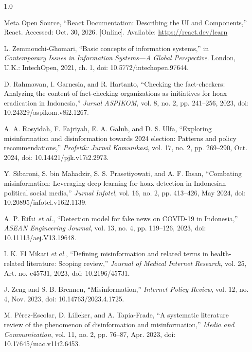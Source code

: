 \documentclass[12pt,a4paper,twoside]{report}
\begin{document}
\begin{spacing}{1.0}
\begin{enumerate}[label={[\arabic*]},leftmargin=0.9cm,itemsep=5pt,topsep=2pt]
  \item Meta Open Source, ``React Documentation: Describing the UI and Components,'' React. Accessed: Oct. 30, 2026. [Online]. Available: \url{https://react.dev/learn}

  \item L. Zemmouchi-Ghomari, ``Basic concepts of information systems,'' in \textit{Contemporary Issues in Information Systems---A Global Perspective}. London, U.K.: IntechOpen, 2021, ch. 1, doi: 10.5772/intechopen.97644.

  \item D. Rahmawan, I. Garnesia, and R. Hartanto, ``Checking the fact-checkers: Analyzing the content of fact-checking organizations as initiatives for hoax eradication in Indonesia,'' \textit{Jurnal ASPIKOM}, vol. 8, no. 2, pp. 241--256, 2023, doi: 10.24329/aspikom.v8i2.1267.

  \item A. A. Rosyidah, F. Fajriyah, E. A. Galuh, and D. S. Ulfa, ``Exploring misinformation and disinformation towards 2024 election: Patterns and policy recommendations,'' \textit{Profetik: Jurnal Komunikasi}, vol. 17, no. 2, pp. 269--290, Oct. 2024, doi: 10.14421/pjk.v17i2.2973.

  \item Y. Sibaroni, S. bin Mahadzir, S. S. Prasetiyowati, and A. F. Ihsan, ``Combating misinformation: Leveraging deep learning for hoax detection in Indonesian political social media,'' \textit{Jurnal Infotel}, vol. 16, no. 2, pp. 413--426, May 2024, doi: 10.20895/infotel.v16i2.1139.

  \item A. P. Rifai \textit{et al.}, ``Detection model for fake news on COVID-19 in Indonesia,'' \textit{ASEAN Engineering Journal}, vol. 13, no. 4, pp. 119--126, 2023, doi: 10.11113/aej.V13.19648.

  \item I. K. El Mikati \textit{et al.}, ``Defining misinformation and related terms in health-related literature: Scoping review,'' \textit{Journal of Medical Internet Research}, vol. 25, Art. no. e45731, 2023, doi: 10.2196/45731.

  \item J. Zeng and S. B. Brennen, ``Misinformation,'' \textit{Internet Policy Review}, vol. 12, no. 4, Nov. 2023, doi: 10.14763/2023.4.1725.

  \item M. P\'{e}rez-Escolar, D. Lilleker, and A. Tapia-Frade, ``A systematic literature review of the phenomenon of disinformation and misinformation,'' \textit{Media and Communication}, vol. 11, no. 2, pp. 76--87, Apr. 2023, doi: 10.17645/mac.v11i2.6453.


\end{enumerate}
\end{spacing}
\end{document}

